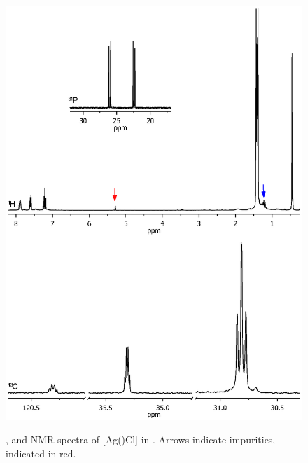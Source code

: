 \begin{figure}[htbp] 
\begin{center}
\vspace{0.5cm}
\includegraphics[trim = 2cm 6cm 2cm 2.5cm, clip]{../NMR/SitBuAgCl.eps}
\caption[NMR spectra for {[}Ag(\tBusixantphos)Cl{]}]{\phosphorus{}, \proton{} and \carbon{} NMR spectra of {[}Ag(\tBusixantphos)Cl{]} in . Arrows indicate impurities,  indicated in red.}
\vspace{0.2cm}
\label{NMRAgCl}
\end{center}
\end{figure}
\vspace{0.2cm}

